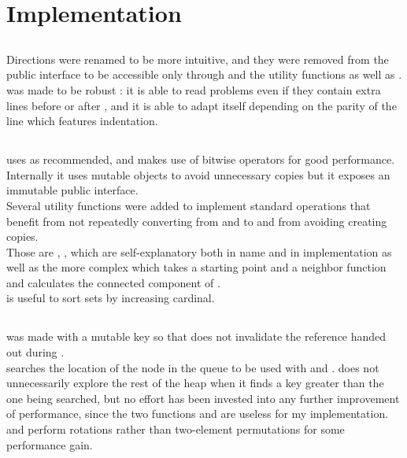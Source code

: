 \section{Implementation}


\subsection{}

Directions were renamed to be more intuitive, and they were removed
from the public interface to be accessible only through 
and the utility functions  as well as .\\

 was made to be robust : it is able to read problems even
if they contain extra lines before  or after ,
and it is able to adapt itself depending on the parity of the line which
features indentation.


\subsection{}

 uses  as recommended, and makes use of
bitwise operators for good performance.\\

Internally it uses mutable objects to avoid unnecessary copies but it exposes
an immutable public interface.\\

Several utility functions were added to implement standard operations that benefit
from not repeatedly converting from and to  and from avoiding creating
copies.\\
Those are , ,  which are self-explanatory
both in name and in implementation as well as the more complex
 which takes a starting point and a 
neighbor function and calculates the connected component of .\\
 is useful to sort sets by increasing cardinal.


\subsection{}

 was made with a mutable key so that  does
not invalidate the reference handed out during .\\
 searches the location of the node in the queue to be used with
 and .  does not unnecessarily explore
the rest of the heap when it finds a key greater than the one being searched,
but no effort has been invested into any further improvement of performance,
since the two functions  and  are useless for
my implementation.\\

 and  perform rotations rather than two-element permutations
for some performance gain.\\


